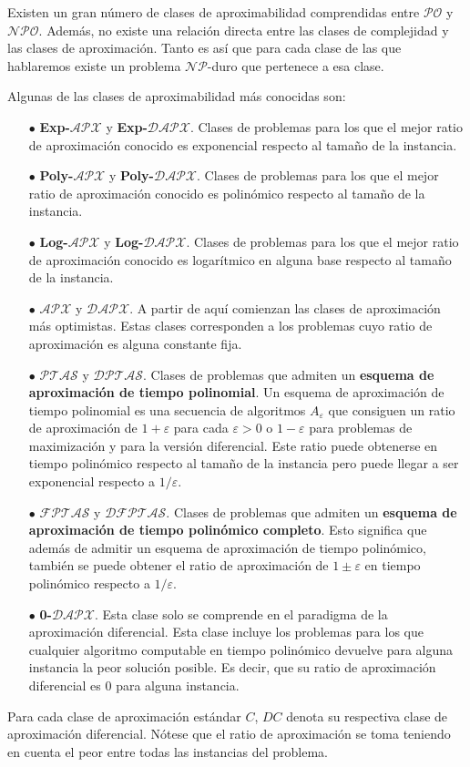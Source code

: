 Existen un gran número de clases de aproximabilidad comprendidas entre $\mathcal{PO}$ y $\mathcal{NPO}$. Además, no existe una relación directa entre las clases de complejidad y las clases de aproximación. Tanto es así que para cada clase de las que hablaremos existe un problema $\mathcal{NP}$-duro que pertenece a esa clase.
\begin{definicion}
    Algunas de las clases de aproximabilidad más conocidas son:
    \begin{itemize}
        \item[$\bullet$] \textbf{Exp-$\mathcal{APX}$} y \textbf{Exp-$\mathcal{DAPX}$}. Clases de problemas para los que el mejor ratio de aproximación conocido es exponencial respecto al tamaño de la instancia.
        \item[$\bullet$] 
        \textbf{Poly-$\mathcal{APX}$} y \textbf{Poly-$\mathcal{DAPX}$}. Clases de problemas para los que el mejor ratio de aproximación conocido es polinómico respecto al tamaño de la instancia.
            \item[$\bullet$] \textbf{Log-$\mathcal{APX}$} y \textbf{Log-$\mathcal{DAPX}$}. Clases de problemas para los que el mejor ratio de aproximación conocido es logarítmico en alguna base respecto al tamaño de la instancia.
        \item[$\bullet$] \textbf{$\mathcal{APX}$} y \textbf{$\mathcal{DAPX}$}. A partir de aquí comienzan las clases de aproximación más optimistas. Estas clases corresponden a los problemas cuyo ratio de aproximación es alguna constante fija.
        \item[$\bullet$] $\mathcal{PTAS}$ y $\mathcal{DPTAS}$. Clases de problemas que admiten un \textbf{esquema de aproximación de tiempo polinomial}. Un esquema de aproximación de tiempo polinomial es una secuencia de algoritmos $A_{\varepsilon}$ que consiguen un ratio de aproximación de $1 + \varepsilon$ para cada $\varepsilon > 0$ o $1 - \varepsilon$ para problemas de maximización y para la versión diferencial. Este ratio puede obtenerse en tiempo polinómico respecto al tamaño de la instancia pero puede llegar a ser exponencial respecto a $1/\varepsilon$.
        \item[$\bullet$] $\mathcal{FPTAS}$ y $\mathcal{DFPTAS}$. Clases de problemas que admiten un \textbf{esquema de aproximación de tiempo polinómico completo}. Esto significa que además de admitir un esquema de aproximación de tiempo polinómico, también se puede obtener el ratio de aproximación de $1 \pm \varepsilon$ en tiempo polinómico respecto a $1/\varepsilon$.
        \item[$\bullet$] \textbf{0-$\mathcal{DAPX}$}. Esta clase solo se comprende en el paradigma de la aproximación diferencial. Esta clase incluye los problemas para los que cualquier algoritmo computable en tiempo polinómico devuelve para alguna instancia la peor solución posible. Es decir, que su ratio de aproximación diferencial es 0 para alguna instancia.
    \end{itemize}
    Para cada clase de aproximación estándar $C$, $DC$ denota su respectiva clase de aproximación diferencial. Nótese que el ratio de aproximación se toma teniendo en cuenta el peor entre todas las instancias del problema. 
\end{definicion}

